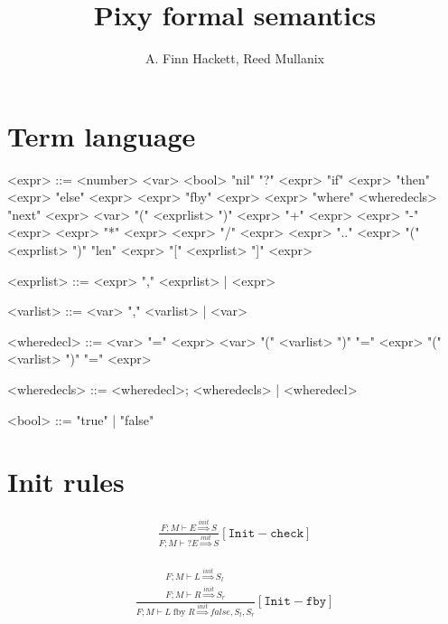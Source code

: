 \documentclass{scrartcl}
\DeclareMathOperator{\fby}{fby}
\begin{document}
    \title{Pixy formal semantics}
    \author{A. Finn Hackett, Reed Mullanix}
    \maketitle
    
    \section{Term language}
    
    \begin{grammar}
        <expr> ::= <number>
            \alt <var>
            \alt <bool>
            \alt "nil"
            \alt "?" <expr>
            \alt "if" <expr> "then" <expr> "else" <expr>
            \alt <expr> "fby" <expr>
            \alt <expr> "where" <wheredecls>
            \alt "next" <expr>
            \alt <var> "(" <exprlist> ")"
            \alt <expr> "+" <expr>
            \alt <expr> "-" <expr>
            \alt <expr> "*" <expr>
            \alt <expr> "/" <expr>
            \alt <expr> ".." <expr>
            \alt "(" <exprlist> ")"
            \alt "len" <expr>
            \alt "[" <exprlist> "]" <expr> 
        
        <exprlist> ::= <expr> "," <exprlist> | <expr>
        
        <varlist> ::= <var> "," <varlist> | <var>
        
        <wheredecl> ::= <var> "=" <expr> 
            \alt <var> "(" <varlist> ")" "=" <expr>
            \alt "(" <varlist> ")" "=" <expr>
            
        <wheredecls> ::= <wheredecl>; <wheredecls> | <wheredecl>
        
        <bool> ::= "true" | "false"
    \end{grammar}

    \section{Init rules}
    
    \begin{align*}
    \frac{
        F; M \vdash E \overset{init}{\Rightarrow} S
    }{
        F; M \vdash ?E \overset{init}{\Rightarrow} S
    }[\mathtt{Init-check}]
    \end{align*}
    
    \begin{align*}
    \frac{
        \begin{matrix}
        F; M \vdash L \overset{init}{\Rightarrow} S_l \\
        F; M \vdash R \overset{init}{\Rightarrow} S_r
        \end{matrix}
    }{
        F; M \vdash L \fby R \overset{init}{\Rightarrow} false, S_l, S_r
    }[\mathtt{Init-fby}]
    \end{align*}
    
\end{document}
